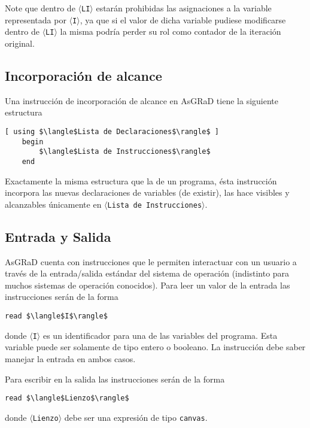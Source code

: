 \documentclass[letterpaper,11pt]{article}
\newcommand{\asgrad}{AsGRaD\xspace}
\newcommand{\general}[1]{$\langle$\texttt{#1}$\rangle$}
\begin{document}
Note que dentro de \general{LI} estarán prohibidas las asignaciones a la variable representada por \general{I}, ya que si el valor de dicha variable pudiese modificarse dentro de \general{LI} la misma podría perder su rol como contador de la iteración original.

\subsection{Incorporación de alcance}

Una instrucción de incorporación de alcance en \asgrad tiene
la siguiente estructura

\begin{lstlisting}[mathescape=true]
    [ using $\langle$Lista de Declaraciones$\rangle$ ]
    begin
        $\langle$Lista de Instrucciones$\rangle$
    end
\end{lstlisting}

Exactamente la misma estructura que la de un programa, ésta instrucción incorpora las nuevas declaraciones de variables (de existir), las hace visibles y alcanzables únicamente en \general{Lista de Instrucciones}.

\subsection{Entrada y Salida}

\asgrad cuenta con instrucciones que le permiten interactuar con un
usuario a través de la entrada/salida estándar del sistema de operación (indistinto para muchos sistemas de operación conocidos). Para leer un valor de la entrada las instrucciones serán de la forma

\begin{lstlisting}[mathescape=true]
    read $\langle$I$\rangle$
\end{lstlisting}

donde \general{I} es un identificador para una de las variables del programa. Esta variable puede ser solamente de tipo entero o booleano. La instrucción debe saber manejar la entrada en ambos casos.

Para escribir en la salida las instrucciones serán de la forma

\begin{lstlisting}[mathescape=true]
    read $\langle$Lienzo$\rangle$
\end{lstlisting}

donde \general{Lienzo} debe ser una expresión de tipo \texttt{canvas}.
\end{document}
